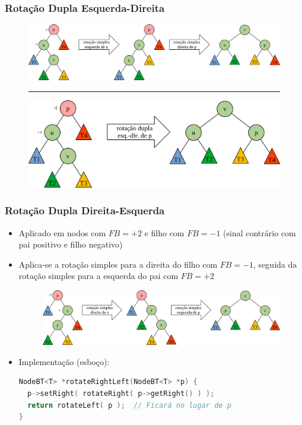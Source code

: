 \documentclass[aspectratio=169]{beamer}
\begin{document}
\begin{frame}[fragile]\frametitle{Rotação Dupla Esquerda-Direita}
\begin{figure}[h]
	\centering
	\includegraphics[height=0.33\paperheight]{imagens/rot_dup_esq_dir0.png}
	\vspace{3mm}
	\hrule
	\vspace{3mm}
	\includegraphics[height=0.33\paperheight]{imagens/rot_dup_esq_dir.png}
\end{figure}
\end{frame}

\begin{frame}[fragile]\frametitle{Rotação Dupla Direita-Esquerda}
\begin{itemize}
	\item Aplicado em nodos com $FB = +2$ e filho com $FB = -1$ (sinal contrário com pai positivo e filho negativo)
	\item Aplica-se a rotação simples para a direita do filho com $FB = -1$, seguida da rotação simples para a esquerda do pai com $FB = +2$
\begin{figure}[h]
	\centering
	\includegraphics[height=0.3\paperheight]{imagens/rot_dup_dir_esq0.png}
\end{figure}
	\item Implementação (esboço):
\begin{lstlisting}[language=C++,basicstyle=\ttfamily\scriptsize]
NodeBT<T> *rotateRightLeft(NodeBT<T> *p) {
  p->setRight( rotateRight( p->getRight() ) );
  return rotateLeft( p );  // Ficará no lugar de p
}
\end{lstlisting}
\end{itemize}
\end{frame}
\end{document}
